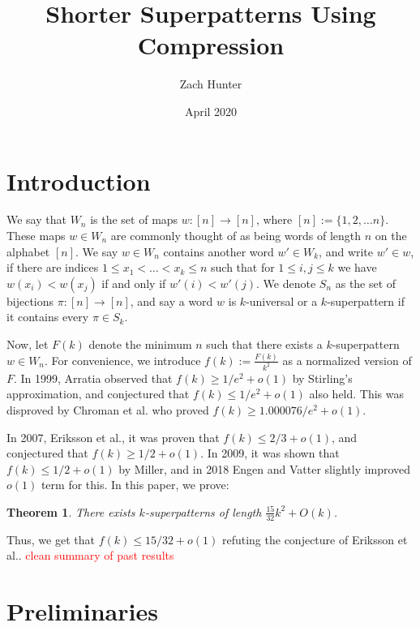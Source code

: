 \documentclass{article}
\title{Shorter Superpatterns Using Compression}
\author{Zach Hunter}
\date{April 2020}
\newcommand{\hide}[1]{}
\newcommand{\edit}[1]{\textcolor{red}{#1}}
\newtheorem{thm}{Theorem}
\begin{document}
\maketitle

\section{Introduction}


We say that $W_n$ is the set of maps $w:[n]\to [n]$, where $[n]:= \{1,2,\dots n\}$. These maps $w \in W_n$ are commonly thought of as being words of length $n$ on the alphabet $[n]$. We say $w \in W_n$ contains another word $w' \in W_k$, and write $w' \in w$, if there are indices $1 \le  x_1 < \dots  < x_k \le  n$ such that for $1 \le i, j \le k$ we have $w(x_i) < w(x_j)$ if and only if $w'(i)<w'(j)$. We denote $S_n$ as the set of bijections $\pi:[n]\to[n]$, and say a word $w$ is $k$-universal or a $k$-superpattern if it contains every $\pi \in S_k$.


Now, let $F(k)$ denote the minimum $n$ such that there exists a $k$-superpattern $w \in W_n$. For convenience, we introduce $f(k) :=\frac{F(k)}{k^2}$ as a normalized version of $F$. In 1999, Arratia observed that $f(k) \ge 1/e^2+o(1)$ by Stirling's approximation, and conjectured that $f(k) \le 1/e^2+o(1)$ also held. This was disproved by Chroman et al. who proved $f(k) \ge 1.000076/e^2 +o(1)$. \hide{https://arxiv.org/abs/2004.02375v1}

In 2007, Eriksson et al., it was proven that $f(k)\le 2/3+o(1)$, and conjectured that $f(k) \ge 1/2+o(1)$. \hide{(H. Eriksson, K. Eriksson, S. Linusson, and J. Wästlund, Dense packing of patterns in a
permutation, Ann. Comb. 11 (2007), no. 3-4, 459–470.)}
In 2009, it was shown that $f(k) \le 1/2+o(1)$ by Miller, and in 2018 Engen and Vatter slightly improved  $o(1)$ term for this.\hide{A. Miller, Asymptotic bounds for permutations containing many different patterns, J. Combin.
Theory Ser. A 116 (2009), no. 1, 92–108.} \hide{Michael Engen and Vincent Vatter. Containing all permutations. 2018. arXiv: 1810.08252 [math.CO].} In this paper, we prove:

\begin{thm}
There exists $k$-superpatterns of length $\frac{15}{32}k^2 +O(k)$.
\end{thm}Thus, we get that $f(k) \le 15/32+o(1)$ refuting the conjecture of Eriksson et al.. \edit{clean summary of past results}


\section{Preliminaries}
\end{document}
